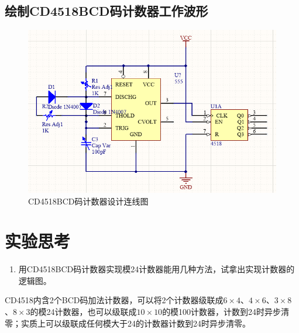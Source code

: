 \documentclass{ctexrep}
\begin{document}
\newpage

\subsection{绘制CD4518BCD码计数器工作波形}%
\label{sub:绘制CD4518BCD码计数器工作波形}

\begin{figure}[htpb]
	\centering
	\includegraphics[width=\linewidth]{341.png}
	\caption{CD4518BCD码计数器设计连线图}
	\label{fig:CD4518BCD码计数器设计连线图}
\end{figure}

\section{实验思考}%
\label{sec:实验思考\arabic{chapter}}

\begin{enumerate}
	\item 用CD4518BCD码计数器实现模24计数器能用几种方法，试拿出实现计数器的逻辑图。
\end{enumerate}

CD4518内含2个BCD码加法计数器，可以将2个计数器级联成$ 6\times 4 $、$ 4\times 6 $、$ 3\times 8 $、$ 8\times 3 $的模24计数器，也可以级联成$ 10\times 10 $的模100计数器，计数到24时异步清零；实质上可以级联成任何模大于24的计数器计数到24时异步清零。
\end{document}
